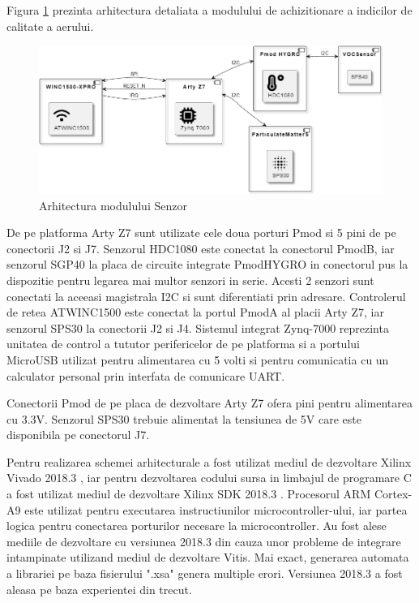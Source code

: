 Figura \ref{fig:PI_SensorUnitDiagram} prezinta arhitectura detaliata a modulului de achizitionare a indicilor de calitate a aerului.
\begin{figure}[H]
    \centering
    \includegraphics[scale=0.5]{figs/PI_SensorUnitDiagram.png}
    \caption{Arhitectura modulului Senzor}
    \label{fig:PI_SensorUnitDiagram}
\end{figure} 

De pe platforma Arty Z7 sunt utilizate cele doua porturi Pmod si 5 pini de pe conectorii J2 si J7. Senzorul HDC1080 este conectat la conectorul PmodB, iar senzorul 
SGP40 la placa de circuite integrate PmodHYGRO in conectorul pus la dispozitie pentru legarea mai multor senzori in serie. Acesti 2 senzori sunt conectati la aceeasi 
magistrala I2C si sunt diferentiati prin adresare. Controlerul de retea ATWINC1500 este conectat la portul PmodA al placii Arty Z7, iar senzorul SPS30 la conectorii J2 
si J4. Sistemul integrat Zynq-7000 reprezinta unitatea de control a tututor perifericelor de pe platforma si a portului MicroUSB utilizat pentru alimentarea cu 5 volti 
si pentru comunicatia cu un calculator personal prin interfata de comunicare UART. 

Conectorii Pmod de pe placa de dezvoltare Arty Z7 ofera pini pentru alimentarea cu 3.3V. Senzorul SPS30 trebuie alimentat la tensiunea de 5V care este disponibila pe 
conectorul J7. 

Pentru realizarea schemei arhitecturale a fost utilizat mediul de dezvoltare Xilinx Vivado 2018.3 \cite{zynq7000ug892}, iar pentru dezvoltarea codului sursa in limbajul 
de programare C a fost utilizat mediul de dezvoltare Xilinx SDK 2018.3 \cite{zynq7000ug1145}. Procesorul ARM Cortex-A9 \cite{zynq7000ug585} este utilizat pentru 
executarea instructiunilor microcontroller-ului, iar partea logica pentru conectarea porturilor necesare la microcontroller. Au fost alese mediile de dezvoltare cu 
versiunea 2018.3 din cauza unor probleme de integrare intampinate utilizand mediul de dezvoltare Vitis. Mai exact, generarea automata a librariei pe baza fisierului 
".xsa" genera multiple erori. Versiunea 2018.3 a fost aleasa pe baza experientei din trecut.

